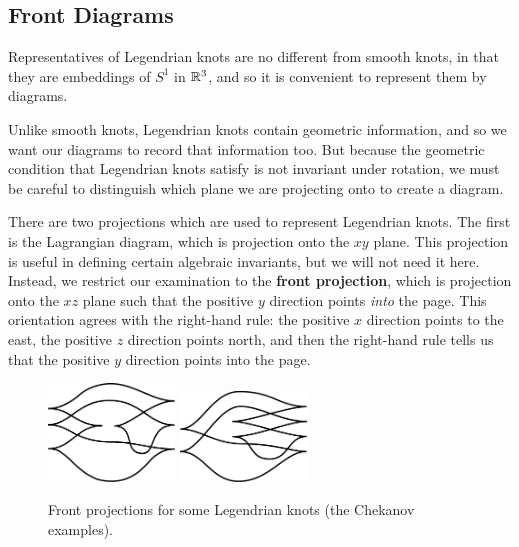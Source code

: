 \subsection{Front Diagrams}

Representatives of Legendrian knots are no different from smooth knots, in that they are embeddings of $S^1$ in $\mathbb{R}^3$, and so it is convenient to represent them by diagrams.

Unlike smooth knots, Legendrian knots contain geometric information, and so we want our diagrams to record that information too. But because the geometric condition that Legendrian knots satisfy is not invariant under rotation, we must be careful to distinguish which plane we are projecting onto to create a diagram.

There are two projections which are used to represent Legendrian knots. The first is the Lagrangian diagram, which is projection onto the $xy$ plane. This projection is useful in defining certain algebraic invariants, but we will not need it here.
Instead, we restrict our examination to the \textbf{front projection}, which is projection onto the $xz$ plane such that the positive $y$ direction points \emph{into} the page. This orientation agrees with the right-hand rule: the positive $x$ direction points to the east, the positive $z$ direction points north, and then the right-hand rule tells us that the positive $y$ direction points into the page.

\begin{figure}[ht]
    \centering
    \includegraphics[width=0.3\textwidth]{images/chekanov-1.pdf}
    \hspace{2em}
    \includegraphics[width=0.3\textwidth]{images/chekanov-2.pdf}
    \caption{Front projections for some Legendrian knots (the Chekanov examples).}%
    \label{fig:front-projection}
\end{figure}

